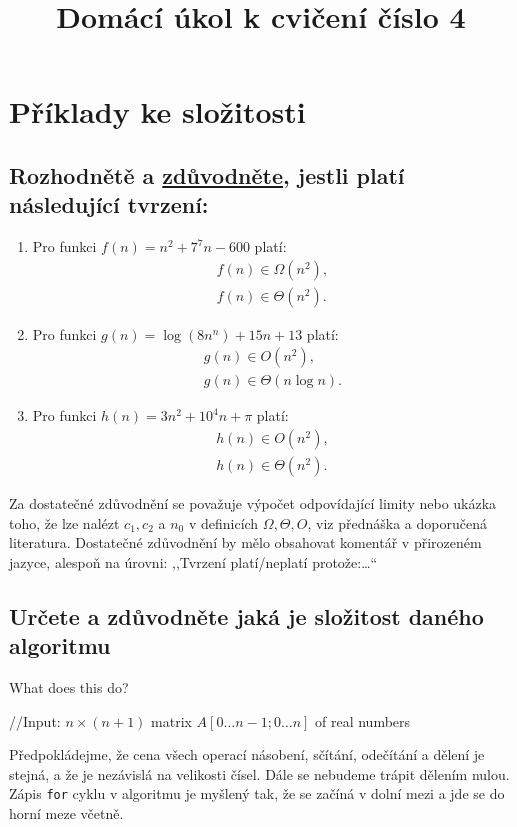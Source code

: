 \documentclass[12pt,oneside]{article}
\title{Domácí úkol k cvičení číslo 4}
\begin{document}
	\maketitle
	\section{Příklady ke složitosti}
	\subsection{Rozhodnětě a \underline{zdůvodněte}, jestli platí následující tvrzení:}
	\begin{enumerate}
		\item Pro funkci $f(n) = n^2 + 7^7n - 600$ platí:
		\begin{align}
			f(n) \in \Omega(n^2), \\
			f(n) \in \Theta(n^2).
		\end{align}
		\item Pro funkci $g(n) = \log(8n^n) + 15n + 13$ platí:
		\begin{align}
			g(n) \in O(n^2), \\
			g(n) \in \Theta(n\log n).
		\end{align}
		\item Pro funkci $h(n) = 3n^2 + 10^4n+  \pi $ platí:
		\begin{align}
			h(n) \in O(n^2) ,\\
			h(n) \in \Theta(n^2).
		\end{align}
	\end{enumerate}
	Za dostatečné zdůvodnění se považuje výpočet odpovídající limity nebo ukázka toho, že lze nalézt $c_1, c_2$ a $n_0$ v definicích $\Omega, \Theta, O$, viz přednáška a doporučená literatura.
	Dostatečné zdůvodnění by mělo obsahovat komentář v přirozeném jazyce, alespoň na úrovni: ,,Tvrzení platí/neplatí protože:\dots``
	
	\subsection{Určete a zdůvodněte jaká je složitost daného algoritmu}
	\begin{algorithm}[ht]
		\caption{What does this do?}
		\DontPrintSemicolon
		//Input: $n\times (n+1)$ matrix $A[0\dots n-1; 0 \dots n]$ of real numbers \;
	\end{algorithm}
	Předpokládejme, že cena všech operací násobení, sčítání, odečítání a dělení je stejná, a že je nezávislá na velikosti čísel.
	Dále se nebudeme trápit dělením nulou.
	Zápis \verb|for| cyklu v algoritmu je myšlený tak, že se začíná v dolní mezi a jde se do horní meze včetně.
	
\end{document}
